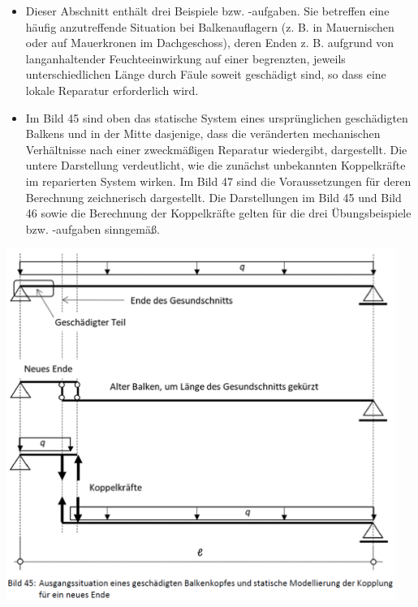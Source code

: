 \documentclass[fleqn,twoside]{article}
\begin{document}
        \begin{minipage}{0.55\textwidth}
            \begin{itemize}
                \item Dieser Abschnitt enthält drei Beispiele bzw. -aufgaben. Sie betreffen eine häufig anzutreffende Situation bei Balkenauflagern (z. B. in Mauernischen oder auf Mauerkronen im Dachgeschoss), deren Enden z. B. aufgrund von langanhaltender Feuchteeinwirkung auf einer begrenzten, jeweils unterschiedlichen Länge durch Fäule soweit geschädigt sind, so dass eine lokale Reparatur erforderlich wird.
                \item Im Bild 45 sind oben das statische System eines ursprünglichen geschädigten Balkens und in der Mitte dasjenige, dass die veränderten mechanischen Verhältnisse nach einer zweckmäßigen Reparatur wiedergibt, dargestellt. Die untere Darstellung verdeutlicht, wie die zunächst unbekannten Koppelkräfte im reparierten System wirken. Im Bild 47 sind die Voraussetzungen für deren Berechnung zeichnerisch dargestellt. Die Darstellungen im Bild 45 und Bild 46 sowie die Berechnung der Koppelkräfte gelten für die drei Übungsbeispiele bzw. -aufgaben sinngemäß.
            \end{itemize}
        \end{minipage}    
        \begin{minipage}{0.45\textwidth}
            \includegraphics[width=0.95\textwidth]{Grafiken/Denkmalpflegerische Arbeit/Balkenkopfreparatur 1.png}
        \end{minipage}
\end{document}
